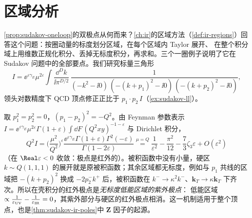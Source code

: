 \section{区域分析}\label{sec:sudakov-regions}

\cref{prop:sudakov-oneloop}的双极点从何而来？\cref{ch:ir}的区域方法（\cref{def:ir-regions}）回答这个问题：按圈动量的标度划分区域，在每个区域内 Taylor 展开、
在整个积分域上用维数正规化积分、丢掉无标度积分，再求和。三个一圈例子说明了它在 Sudakov 问题中的全部要点。我们研究标量三角形
\begin{equation}\label{eq:sudakov-triangle}
I=\ee^{\varepsilon\gamma_E}\mu^{2\varepsilon}\int\!\frac{\dd^Dk}{\ii\pi^{D/2}}\,
\frac{1}{(-k^2-\ii0)\,(-(k+p_1)^2-\ii0)\,(-(k+p_2)^2-\ii0)},
\end{equation}
领头对数精度下 QCD 顶点修正正比于 $p_1\cdot p_2\,I$（\cref{ex:sudakov-ll}）。

\begin{example}[在壳无质量形状因子 = 硬区]\label{ex:sudakov-onshell-hard}
取 $p_1^2=p_2^2=0$，$(p_1-p_2)^2=-Q^2$。由 Feynman 参数表示 $I=\ee^{\varepsilon\gamma_E}\mu^{2\varepsilon}\Gamma(1+\varepsilon)\int\!\dd F\,(Q^2xy)^{-1-\varepsilon}$ 与 Dirichlet 积分，
\begin{equation}\label{eq:sudakov-onshell-H}
Q^2I=\Big(\frac{\mu^2}{Q^2}\Big)^{\varepsilon}\frac{\ee^{\varepsilon\gamma_E}\Gamma(1+\varepsilon)\Gamma^2(-\varepsilon)}{\Gamma(1-2\varepsilon)}
\overset{\mu=Q}{=}\frac1{\varepsilon^2}-\frac{\pi^2}{12}-\frac73\zeta_3\varepsilon+O(\varepsilon^2)
\end{equation}
（在 $\Real\varepsilon<0$ 收敛：极点是红外的）。被积函数中没有小量，硬区 $k\sim Q(1,1,1)$ 的展开就是原被积函数；其余区域都无标度，例如与 $p_1$ 共线的区域把
$-(k+p_2)^2$ 换成 $-2p_2^-k^+$ 后，被积函数在 $k^-\to\kappa^2k^-$、$\mathbf k_T\to\kappa\mathbf k_T$ 下齐次。所以在壳积分的红外极点是\emph{无标度低能区域的紫外极点}：
低能区域 $\propto\frac1{\varepsilon_{\rm UV}}-\frac1{\varepsilon_{\rm IR}}=0$，其紫外部分与硬区的红外极点相消。这一机制适用于整个顶点，也是\cref{thm:sudakov-ir-poles}中 $\mathbf Z$ 因子的起源。
\end{example}

